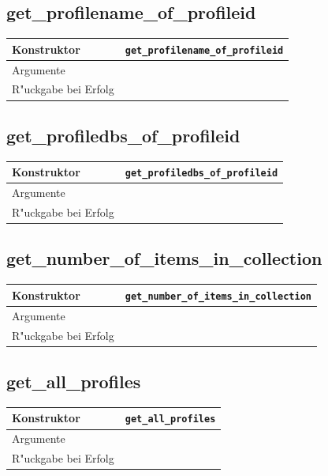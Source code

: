\documentclass[11pt, twoside, a4paper, BCOR8mm, DIV12, bibtotoc,idxtotoc]{scrbook}
\begin{document}
\subsection{get\_profilename\_of\_profileid}
\begin{shadowenv}
\begin{tabular}{lp{10cm}}
  Konstruktor & \texttt{get\_profilename\_of\_profileid}\\
  \hline
  Argumente     & \\
  R"uckgabe bei Erfolg & \\
\end{tabular}
\end{shadowenv}

\subsection{get\_profiledbs\_of\_profileid}
\begin{shadowenv}
\begin{tabular}{lp{10cm}}
  Konstruktor & \texttt{get\_profiledbs\_of\_profileid}\\
  \hline
  Argumente     & \\
  R"uckgabe bei Erfolg & \\
\end{tabular}
\end{shadowenv}

\subsection{get\_number\_of\_items\_in\_collection}
\begin{shadowenv}
\begin{tabular}{lp{10cm}}
  Konstruktor & \texttt{get\_number\_of\_items\_in\_collection}\\
  \hline
  Argumente     & \\
  R"uckgabe bei Erfolg & \\
\end{tabular}
\end{shadowenv}

\subsection{get\_all\_profiles}
\begin{shadowenv}
\begin{tabular}{lp{10cm}}
  Konstruktor & \texttt{get\_all\_profiles}\\
  \hline
  Argumente     & \\
  R"uckgabe bei Erfolg & \\
\end{tabular}
\end{shadowenv}
\end{document}
